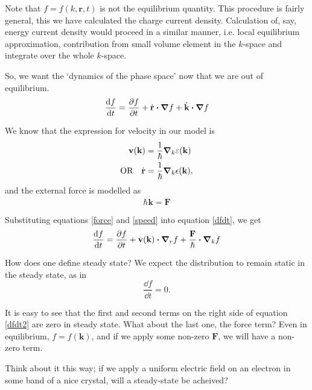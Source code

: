 \documentclass[a4paper]{article}
\newcommand{\hcut}{\hbar}
\begin{document}
Note that $f = f(k, \mathbf{r}, t)$ is not the equilibrium quantity.
This procedure is fairly general, this we have calculated the charge
current density. Calculation of, say, energy current density would
proceed in a similar manner, i.e. local equilibrium approximation,
contribution from small volume element in the $k$-space and integrate
over the whole $k$-space.

So, we want the `dynamics of the phase space' now that we are out of 
equilibrium.
\begin{equation}
	\label{dfdt}
	\frac{\dd f}{\dd t} = \pdv{f}{t} + \dot{\mathbf{r}}\vdot \grad f + \dot{\textbf{k}}\vdot\grad f
\end{equation}

We know that the expression for velocity in our model is
\begin{equation}
	\label{speed}
	\begin{split}
		\mathbf{v}(\mathbf{k}) &= \frac{1}{\hbar}\grad_k\varepsilon(\mathbf{k})\\
		\text{OR}\quad \dot{\textbf{r}} &= \frac{1}{\hcut}\grad_k\epsilon(\textbf{k}),
	\end{split}
\end{equation}
and the external force is modelled as
\begin{equation}
	\label{force}
	\hbar \dot{\mathbf{k}} = \mathbf{F}
\end{equation}

Substituting equations \ref{force} and \ref{speed} into equation
\ref{dfdt}, we get
\begin{equation}
	\label{dfdt2}
	\frac{\dd f}{\dd t} = \pdv{f}{t} +  \mathbf{v}(\mathbf{k})\vdot\grad_rf + \frac{\mathbf{F}}{\hbar}\vdot\grad_k f
\end{equation}

How does one define steady state? We expect the distribution to remain
static in the steady state, as in
\begin{equation} 
	\label{equil}
	\frac{\dd f}{\dd t} = 0.
\end{equation}

It is easy to see that the first and second terms on the right side
of equation \ref{dfdt2} are zero in steady state. What about the last
one, the force term? Even in equilibrium,  $f = f(\textbf{k})$, and if
we apply some non-zero $\textbf{F}$, we will have a non-zero term.

Think about it this way; if we apply a uniform electric field on an
electron in some band of a nice crystal, will a steady-state be acheived?
\end{document}

